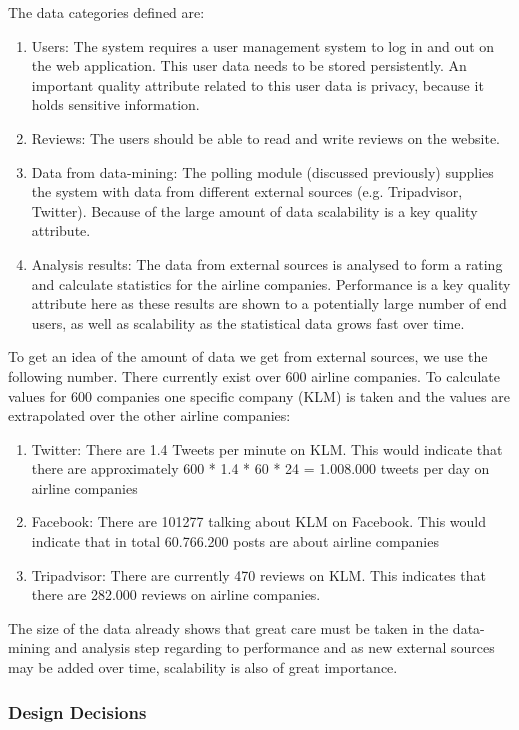 \documentclass{article}
\begin{document}
The data categories defined are:
\begin{enumerate}
\item Users: The system requires a user management system to log in and out on the web application. This user data needs to be stored persistently. An important quality attribute related to this user data is privacy, because it holds sensitive information.
\item Reviews: The users should be able to read and write reviews on the website.
\item Data from data-mining: The polling module (discussed previously) supplies the system with data from different external sources (e.g. Tripadvisor, Twitter). Because of the large amount of data scalability is a key quality attribute.
\item Analysis results: The data from external sources is analysed to form a rating and calculate statistics for the airline companies. Performance is a key quality attribute here as these results are shown to a potentially large number of end users, as well as scalability as the statistical data grows fast over time.
\end{enumerate}

To get an idea of the amount of data we get from external sources, we use the following number. There currently exist over 600 airline companies. To calculate values for 600 companies one specific company (KLM) is taken and the values are extrapolated over the other airline companies:
\begin{enumerate}
\item Twitter: There are 1.4 Tweets per minute on KLM. This would indicate that there are approximately 600 * 1.4 * 60 * 24 = 1.008.000 tweets per day on airline companies
\item Facebook: There are 101277 talking about KLM on Facebook. This would indicate that in total 60.766.200 posts are about airline companies
\item Tripadvisor: There are currently 470 reviews on KLM. This indicates that there are 282.000 reviews on airline companies.
\end{enumerate}
The size of the data already shows that great care must be taken in the data-mining and analysis step regarding to performance and as new external sources may be added over time, scalability is also of great importance.


\subsubsection{Design Decisions}
\end{document}
